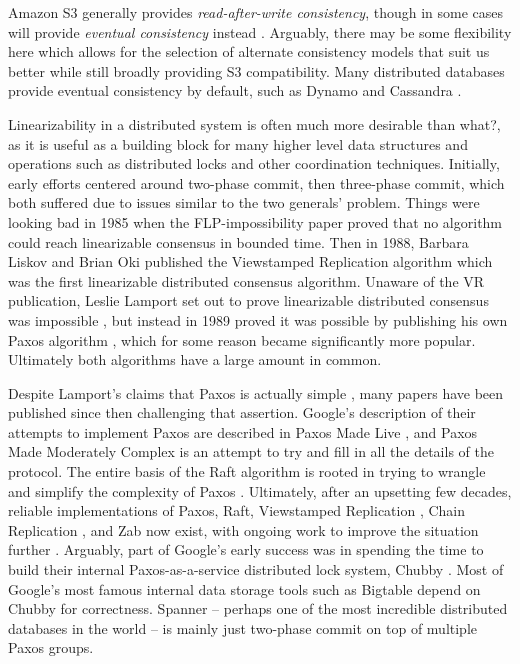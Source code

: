 \documentclass[11pt,fleqn,openany]{book}
\newcommand{\bs}[1]{{\color{red}#1}}
\begin{document}
Amazon S3 generally provides {\em read-after-write consistency}, though in some
cases will provide {\em eventual consistency} instead \cite{s3-consistency}.
Arguably, there may be some flexibility here which allows for the selection
of alternate consistency models that suit us better while still broadly
providing S3 compatibility.
Many distributed databases provide eventual consistency by
default, such as Dynamo \cite{dynamo} and Cassandra \cite{cassandra}.

Linearizability in a distributed system is often much more desirable
\bs{than what?}, as it is
useful as a building block for many higher level data structures and operations
such as distributed locks and other coordination techniques. Initially, early
efforts centered around two-phase commit, then three-phase commit, which both
suffered due to issues similar to the two generals' problem. Things were looking
bad in 1985 when the FLP-impossibility paper \cite{flp} proved that no algorithm
could reach linearizable consensus in bounded time. Then in 1988, Barbara Liskov
and Brian Oki published the Viewstamped Replication algorithm \cite{vr} which
was the first linearizable distributed consensus algorithm. Unaware of the VR
publication, Leslie Lamport set out to prove linearizable distributed consensus
was impossible \cite{paxos-note}, but instead in 1989 proved it was possible by
publishing his own Paxos algorithm \cite{paxos}, which for some reason became
significantly more popular. Ultimately both algorithms have a large amount in
common.

Despite Lamport's claims that Paxos is actually simple \cite{paxos-simple},
many papers have been published since then
challenging that assertion. Google's description of their attempts to implement
Paxos are described in Paxos Made Live \cite{paxos-live},
and Paxos Made Moderately
Complex \cite{paxos-complex} is an attempt to try and fill in all the details of
the protocol. The entire basis of the Raft algorithm is rooted in trying to
wrangle and simplify the complexity of Paxos \cite{raft}. Ultimately, after an
upsetting few decades, reliable implementations of Paxos, Raft, Viewstamped
Replication \cite{vrr}, Chain Replication \cite{chain-rep}, and Zab \cite{zab}
now exist, with ongoing work to improve the situation
further \cite{epaxos,paxos-flexible}. Arguably, part of Google's early success
was in spending the time to build their internal Paxos-as-a-service distributed
lock system, Chubby \cite{chubby}. Most of Google's most famous internal data
storage tools such as Bigtable \cite{bigtable} depend on Chubby for
correctness. Spanner \cite{spanner} -- perhaps one of the most incredible
distributed databases in the world -- is mainly just two-phase commit on top of
multiple Paxos groups.
\end{document}
